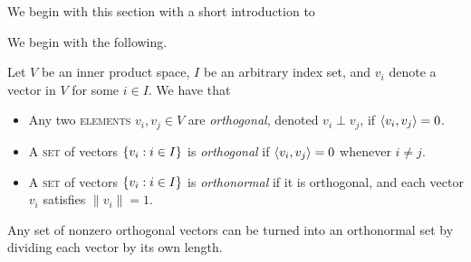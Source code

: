 \documentclass[../thesis.tex]{subfiles}
\begin{document}
We begin with this section with a short introduction to 

We begin with the following. 

\begin{definition}
    Let $V$ be an inner product space, $I$ be an arbitrary index set, and $v_i$ denote a vector in $V$ for some $i \in I$. We have that
    \begin{itemize}%
        \item Any two \textsc{elements} $v_i, v_j \in V$ are \emph{orthogonal}, denoted $v_i \perp v_j$, if $\langle v_i,v_j\rangle = 0$.
        \item A \textsc{set} of vectors $\{v_i : i \in I\}$ is \emph{orthogonal} if $\langle v_i,v_j\rangle = 0$ whenever $i \neq j$. %
        \item A \textsc{set} of vectors $\{v_i : i \in I\}$ is \emph{orthonormal} if it is orthogonal, and each vector $v_i$ satisfies $\|v_i\| = 1$. %
        \qedhere
    \end{itemize}
\end{definition}
\begin{remark}
    Any set of nonzero orthogonal vectors can be turned into an orthonormal set by dividing each vector by its own length.
\end{remark}
\end{document}

